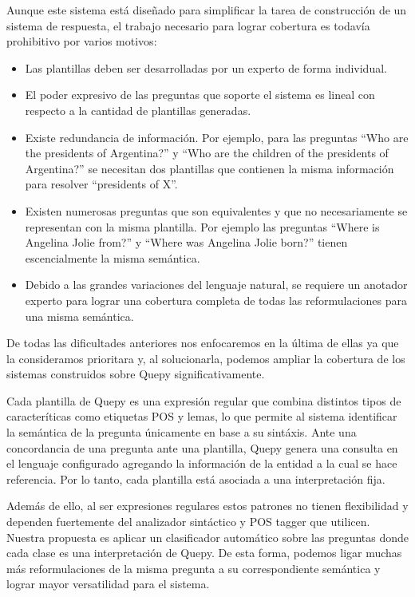 Aunque este sistema está diseñado para simplificar la tarea de construcción de un sistema de respuesta, el trabajo necesario para lograr cobertura es todavía prohibitivo por varios motivos:
\begin{itemize}
    \item Las plantillas deben ser desarrolladas por un experto de forma individual.
    \item El poder expresivo de las preguntas que soporte el sistema es lineal con respecto a la cantidad de plantillas generadas.
    \item Existe redundancia de información. Por ejemplo, para las preguntas ``Who are the presidents of Argentina?'' y ``Who are the children of the presidents of Argentina?'' se necesitan dos plantillas que contienen la misma información para resolver ``presidents of X''.
    \item Existen numerosas preguntas que son equivalentes y que no necesariamente se representan con la misma plantilla. Por ejemplo las preguntas ``Where is Angelina Jolie from?'' y ``Where was Angelina Jolie born?'' tienen escencialmente la misma semántica.
    \item Debido a las grandes variaciones del lenguaje natural, se requiere un anotador experto para lograr una cobertura completa de todas las reformulaciones para una misma semántica.
\end{itemize}

De todas las dificultades anteriores nos enfocaremos en la última de ellas ya que la consideramos prioritara y, al solucionarla, podemos ampliar la cobertura de los sistemas construidos sobre Quepy significativamente.

Cada plantilla de Quepy es una expresión regular que combina distintos tipos de caracteríticas como etiquetas POS y lemas, lo que permite al sistema identificar la semántica de la pregunta únicamente en base a su sintáxis. Ante una concordancia de una pregunta ante una plantilla, Quepy genera una consulta en el lenguaje configurado agregando la información de la entidad a la cual se hace referencia. Por lo tanto, cada plantilla está asociada a una interpretación fija.


Además de ello, al ser expresiones regulares estos patrones no tienen flexibilidad y dependen fuertemente del analizador sintáctico y POS tagger que utilicen. Nuestra propuesta es aplicar un clasificador automático sobre las preguntas donde cada clase es una interpretación de Quepy. De esta forma, podemos ligar muchas más reformulaciones de la misma pregunta a su correspondiente semántica y lograr mayor versatilidad para el sistema.

